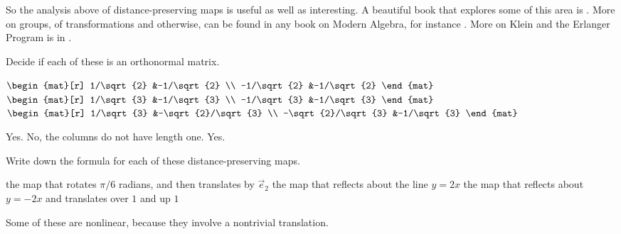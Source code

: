 So the analysis above of distance-preserving maps
is useful as well as interesting.
A beautiful book that explores some of this area is \cite{Weyl}.
More on groups, of transformations and otherwise, can be found in any book
on Modern Algebra, for instance \cite{BirkhoffMaclane}.
More on Klein and the Erlanger Program is in \cite{Yaglom}.
 

\begin{exercises}
  \item 
    Decide if each of these is an orthonormal matrix.
    \begin{exparts}
      \partsitem $\begin{mat}[r]
                    1/\sqrt{2} &-1/\sqrt{2}  \\
                   -1/\sqrt{2} &-1/\sqrt{2}
                  \end{mat}$
      \partsitem $\begin{mat}[r]
                    1/\sqrt{3} &-1/\sqrt{3}  \\
                   -1/\sqrt{3} &-1/\sqrt{3}
                  \end{mat}$
      \partsitem $\begin{mat}[r]
                    1/\sqrt{3} &-\sqrt{2}/\sqrt{3}  \\
                   -\sqrt{2}/\sqrt{3} &-1/\sqrt{3}
                  \end{mat}$
    \end{exparts}
    \begin{answer}
      \begin{exparts}
        \partsitem Yes.
        \partsitem No, the columns do not have length one.
        \partsitem Yes.
      \end{exparts}
    \end{answer}
  \item 
    Write down the formula for each of these distance-preserving maps.
    \begin{exparts}  
      \partsitem the map that rotates $\pi/6$ radians, and then
        translates by $\vec{e}_2$
      \partsitem the map that reflects about the line $y=2x$
      \partsitem the map that reflects about $y=-2x$ and translates over $1$
        and up $1$
    \end{exparts}
    \begin{answer}
      Some of these are nonlinear, 
      because they involve a nontrivial translation.
\end{answer}
\end{exercises}
